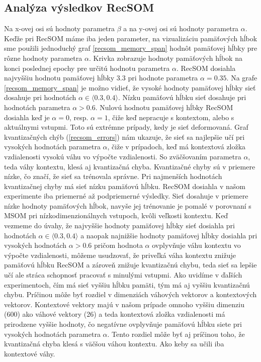 \subsection{Analýza výsledkov RecSOM}
Na x-ovej osi sú hodnoty parametra $\beta$ a na y-ovej osi sú hodnoty parametra $\alpha$.
Keďže pri RecSOM máme iba jeden parameter, na vizualizáciu pamäťových hĺbok sme použili jednoduchý graf \ref{recsom_memory_span} hodnôt pamäťovej hĺbky pre rôzne hodnoty parametra $\alpha$.
Krivka zobrazuje hodnoty pamäťových hĺbok na konci poslednej epochy pre určitú hodnotu parametra $\alpha$.
RecSOM dosiahla najvyššiu hodnotu pamäťovej hĺbky $3.3$ pri hodnote parametra $\alpha = 0.35$.
Na grafe \ref{recsom_memory_span} je možno vidieť, že vysoké hodnoty pamäťovej hĺbky sieť dosahuje pri hodnotách $\alpha \in \langle 0.3, 0.4 \rangle$. 
Nízku pamäťovú hĺbku sieť dosahuje pri hodnotách parametra $\alpha > 0.6$.
Nulovú  hodnotu pamäťovej hĺbky RecSOM dosiahla keď je $\alpha = 0$, resp. $\alpha = 1$, čiže keď nepracuje s kontextom, alebo s aktuálnymi vstupmi. 
Toto sú extrémne prípady, kedy je sieť deformovaná.
Graf kvantizačných chýb (\ref{recsom_errors}) nám ukazuje, že sieť sa najlepšie učí pri vysokých hodnotách parametra $\alpha$, čiže v prípadoch, keď má 
kontextová zložka vzdialenosti vysokú váhu vo výpočte vzdialenosti. 
So zväčšovaním parametra $\alpha$, teda váhy kontextu, klesá aj kvantizačná chyba.
Kvantizačné chyby sú v priemere nízke, čo značí, že sieť sa trénovala správne.
Pri najmenších hodnotách kvantizačnej chyby má sieť nízku pamäťovú hĺbku.
RecSOM dosiahla v našom experimente iba priemerné až podpriemerné výsledky. Sieť dosahuje v priemere nízke hodnoty pamäťových hĺbok, navyše jej trénovanie je pomalé v porovnaní s MSOM pri nízkodimenzionálnych vstupoch, kvôli veľkosti kontextu.
Keď vezmeme do úvahy, že najvyššie hodnoty pamäťovej hĺbky sieť dosiahla pri hodnotách $\alpha \in \langle 0.3, 0.4 \rangle$ a naopak najnižšie hodnoty pamäťovej hĺbky dosiahla pri vysokých hodnotách $\alpha > 0.6$
pričom hodnota $\alpha$ ovplyvňuje váhu kontextu vo výpočte vzdialenosti, môžeme usudzovať, že priveľká váha kontextu znižuje pamäťovú hĺbku RecSOM a zároveň znižuje kvantizačnú chybu, teda sieť sa lepšie učí ale stráca schopnosť pracovať s minulými vstupmi. 
Ako uvidíme v ďaľších experimentoch, čím má sieť vyššiu hĺbku pamäti, tým má aj vyššiu kvantizačnú chybu.
Príčinou môže byť rozdiel v dimenziách váhových vektorov a kontextových vektorov. Kontextové vektory majú v našom prípade omnoho vyššiu dimenziu (600) ako váhové vektory (26) a 
teda kontextová zložka vzdialenosti má prirodzene vyššie hodnoty, čo negatívne ovplyvňuje pamäťovú hĺbku siete pri vysokých hodnotách parametra $\alpha$.
Tento rozdiel môže byť aj príčinou toho, že kvantizačná chyba klesá s väčšou váhou kontextu. Ako keby sa učili iba kontextové váhy.


